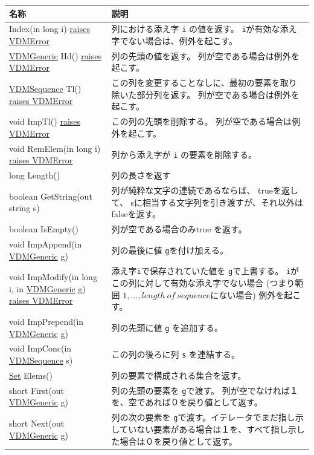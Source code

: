 \documentclass[\pformat,12pt]{jarticle}
\newcommand{\pbs}[1]{\let\temp=\\#1\let\\=\temp}
\newenvironment{interfacetable}{%
  \begin{longtable}{|>{\pbs\raggedright\ttfamily}p{6.6cm}%
                    |>{\pbs\raggedright}p{6.6cm}|} \hline
  \textrm{\bfseries 名称} &  \textbf{説明} \\ \hline
  \endhead
  }{\end{longtable}}
\newcommand{\APIError}{\hyperlink{exception.APIError}{raises APIError}}
\newcommand{\VDMError}{\hyperlink{exception.VDMError}{raises VDMError}}
\newcommand{\VDMGeneric}{\hyperlink{interface.Generic}{VDMGeneric}}
\newcommand{\VDMSequence}{\hyperlink{interface.VDMSequence}{VDMSequence}}
\newcommand{\Set}{\hyperlink{interface.VDMSet}{Set}}
\begin{document}
\begin{interfacetable}
{\VDMGeneric} Index(in long i) {\VDMError}
 & 列における添え字 \texttt{i} の値を返す。
    \texttt{i}が有効な添え字でない場合は、例外を起こす。
\\ \hline
{\VDMGeneric} Hd() {\VDMError}
 & 列の先頭の値を返す。
    列が空である場合は例外を起こす。
\\ \hline
{\VDMSequence} Tl() {\VDMError}
 & この列を変更することなしに、最初の要素を取り除いた部分列を返す。
    列が空である場合は例外を起こす。
\\ \hline
void ImpTl() {\VDMError}
 & この列の先頭を削除する。
 列が空である場合は例外を起こす。
\\ \hline
void RemElem(in long i) {\VDMError}
 & 列から添え字が \texttt{i} の要素を削除する。
\\ \hline
long Length()
 & 列の長さを返す
\\ \hline
boolean GetString(out string s)
 & 列が純粋な文字の連続であるならば、 trueを返して、
   sに相当する文字列を引き渡すが、それ以外は falseを返す。
\\ \hline
boolean IsEmpty()
 & 列が空である場合のみtrue を返す。
\\ \hline
void ImpAppend(in {\VDMGeneric} g) %
 & 列の最後に値 \texttt{g}を付け加える。
\\ \hline
void ImpModify(in long i, in {\VDMGeneric} g) {\VDMError}%
 & 添え字\texttt{i}で保存されていた値を \texttt{g}で上書する。
   \texttt{i}がこの列に対して有効な添え字でない場合
    (つまり範囲 $1,\ldots,length\ of\ sequence$にない場合)
    例外を起こす。
\\ \hline
void ImpPrepend(in {\VDMGeneric} g) %
 & 列の先頭に値 \texttt{g} を追加する。
\\ \hline
void ImpConc(in {\VDMSequence} s) %
 & この列の後ろに列 \texttt{s} を連結する。
\\ \hline
{\Set} Elems()
 & 列の要素で構成される集合を返す。
\\ \hline
short First(out {\VDMGeneric} g)
 & 列の先頭の要素を \texttt{g}で渡す。
   列が空でなければ１を、空であれば０を戻り値として返す。
\\ \hline
short Next(out {\VDMGeneric} g)
 & 列の次の要素を \texttt{g}で渡す。イテレータでまだ指し示していない要素がある場合は１を、すべて指し示した場合は０を戻り値として返す。
\\ \hline
\end{interfacetable}
\end{document}
